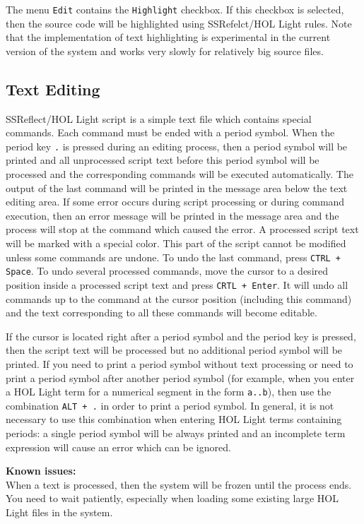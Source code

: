 \documentclass[a4paper]{article}
\newcommand{\issues}{{\bf Known issues:}\\}
\begin{document}
The menu {\tt Edit} contains the {\tt Highlight} checkbox. If this checkbox is selected, then the source code will be highlighted using SSRefelct/HOL Light rules. Note that the implementation of text highlighting is experimental in the current version of the system and works very slowly for relatively big source files.

\subsection{Text Editing}
SSReflect/HOL Light script is a simple text file which contains special commands. Each command must be ended with a period symbol. When the period key \verb|.| is pressed during an editing process, then a period symbol will be printed and all unprocessed script text before this period symbol will be processed and the corresponding commands will be executed automatically. The output of the last command will be printed in the message area below the text editing area. If some error occurs during script processing or during command execution, then an error message will be printed in the message area and the process will stop at the command which caused the error. A processed script text will be marked with a special color. This part of the script cannot be modified unless some commands are undone. To undo the last command, press \verb|CTRL + Space|.
To undo several processed commands, move the cursor to a desired position inside a processed script text and press \verb|CRTL + Enter|. It will undo all commands up to the command at the cursor position (including this command) and the text corresponding to all these commands will become editable.

If the cursor is located right after a period symbol and the period key is pressed, then the script text will be processed but no additional period symbol will be printed. If you need to print a period symbol without text processing or need to print a period symbol after another period symbol (for example, when you enter a HOL Light term for a numerical segment in the form \verb|a..b|), then use the combination \verb|ALT + .| in order to print a period symbol. In general, it is not necessary to use this combination when entering HOL Light terms containing periods: a single period symbol will be always printed and an incomplete term expression will cause an error which can be ignored.

\issues
When a text is processed, then the system will be frozen until the process ends. You need to wait patiently, especially when loading some existing large HOL Light files in the system.
\end{document}
